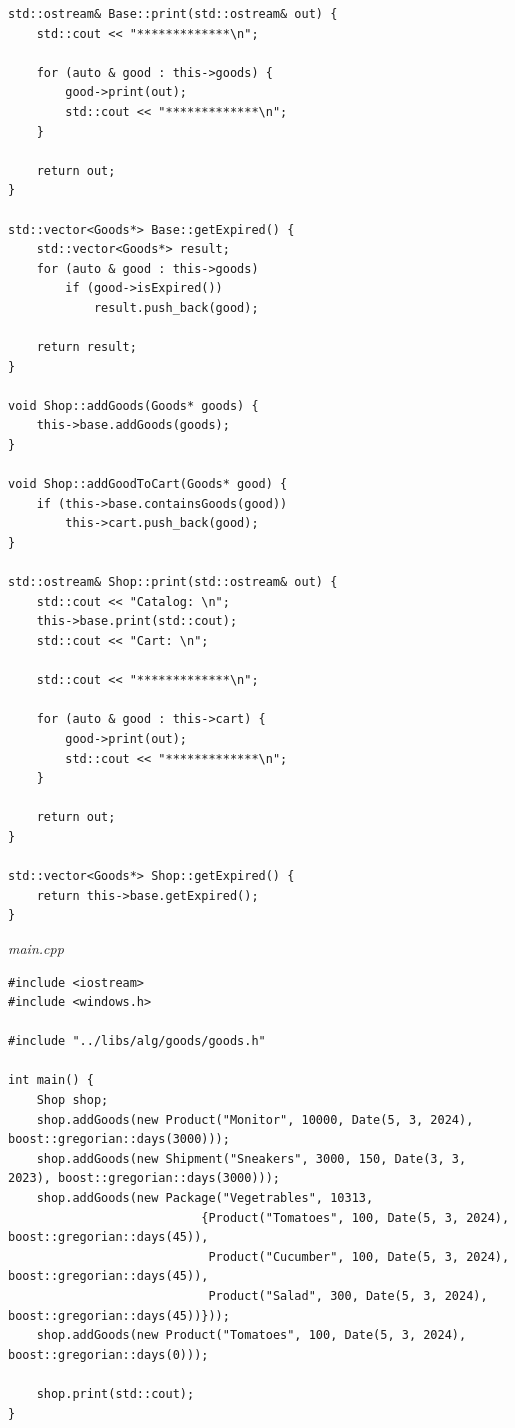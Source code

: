 \documentclass[a4paper,14pt]{extarticle}
\begin{document}
\begin{verbatim}
std::ostream& Base::print(std::ostream& out) {
    std::cout << "*************\n";

    for (auto & good : this->goods) {
        good->print(out);
        std::cout << "*************\n";
    }

    return out;
}

std::vector<Goods*> Base::getExpired() {
    std::vector<Goods*> result;
    for (auto & good : this->goods)
        if (good->isExpired())
            result.push_back(good);

    return result;
}

void Shop::addGoods(Goods* goods) {
    this->base.addGoods(goods);
}

void Shop::addGoodToCart(Goods* good) {
    if (this->base.containsGoods(good))
        this->cart.push_back(good);
}

std::ostream& Shop::print(std::ostream& out) {
    std::cout << "Catalog: \n";
    this->base.print(std::cout);
    std::cout << "Cart: \n";

    std::cout << "*************\n";

    for (auto & good : this->cart) {
        good->print(out);
        std::cout << "*************\n";
    }

    return out;
}

std::vector<Goods*> Shop::getExpired() {
    return this->base.getExpired();
}
\end{verbatim}

\textit{main.cpp}
\begin{verbatim}
#include <iostream>
#include <windows.h>

#include "../libs/alg/goods/goods.h"

int main() {
    Shop shop;
    shop.addGoods(new Product("Monitor", 10000, Date(5, 3, 2024), boost::gregorian::days(3000)));
    shop.addGoods(new Shipment("Sneakers", 3000, 150, Date(3, 3, 2023), boost::gregorian::days(3000)));
    shop.addGoods(new Package("Vegetrables", 10313,
                           {Product("Tomatoes", 100, Date(5, 3, 2024), boost::gregorian::days(45)),
                            Product("Cucumber", 100, Date(5, 3, 2024), boost::gregorian::days(45)),
                            Product("Salad", 300, Date(5, 3, 2024), boost::gregorian::days(45))}));
    shop.addGoods(new Product("Tomatoes", 100, Date(5, 3, 2024), boost::gregorian::days(0)));

    shop.print(std::cout);
}
\end{verbatim}
\end{document}
